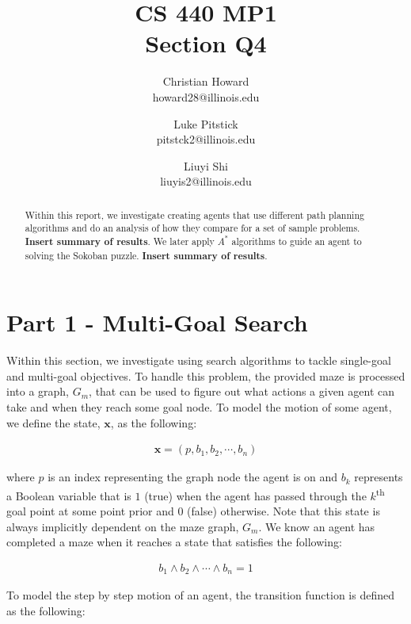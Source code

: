 \documentclass{article}[12pt]
\title{CS 440 MP1 \\ Section Q4}
\author{
Christian Howard \\ howard28@illinois.edu
\and
Luke Pitstick \\ pitstck2@illinois.edu
\and
Liuyi Shi \\ liuyis2@illinois.edu
}
\date{} %
\begin{document}
   
   \maketitle
   \begin{abstract}
   Within this report, we investigate creating agents that use different path planning algorithms and do an analysis of how they compare for a set of sample problems. \textbf{Insert summary of results}. We later apply $A^*$ algorithms to guide an agent to solving the  Sokoban puzzle. \textbf{Insert summary of results}.
   \end{abstract}
   \newpage
   
   \tableofcontents
   \newpage
   
   \section{Part 1 - Multi-Goal Search}
   Within this section, we investigate using search algorithms to tackle single-goal and multi-goal objectives. To handle this problem, the provided maze is processed into a graph, $G_m$, that can be used to figure out what actions a given agent can take and when they reach some goal node. To model the motion of some agent, we define the state, $\boldsymbol{x}$, as the following:  
   
   \begin{align*}
   \boldsymbol{x} = \left( p, b_1, b_2, \cdots, b_n \right)
   \end{align*}
   
   where $p$ is an index representing the graph node the agent is on and $b_k$ represents a Boolean variable that is $1$ (true) when the agent has passed through the $k$\textsuperscript{th} goal point at some point prior and $0$ (false) otherwise. Note that this state is always implicitly dependent on the maze graph, $G_m$. We know an agent has completed a maze when it reaches a state that satisfies the following:
   
   \begin{align*}
   b_1 \wedge b_2 \wedge \cdots \wedge b_n = 1
   \end{align*}
   
   To model the step by step motion of an agent, the transition function is defined as the following:
   
\end{document}
